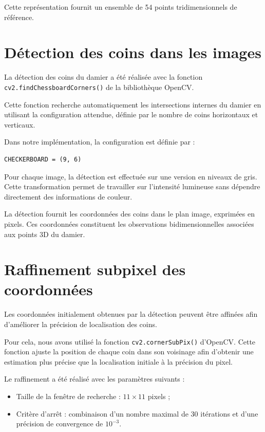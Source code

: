 \documentclass[12pt,a4paper]{report}
\begin{document}
Cette représentation fournit un ensemble de
54 points tridimensionnels de référence.

\section{Détection des coins dans les images}

La détection des coins du damier a été réalisée
avec la fonction
\texttt{cv2.findChessboardCorners()} de la
bibliothèque OpenCV.

Cette fonction recherche automatiquement les
intersections internes du damier en utilisant
la configuration attendue, définie par le nombre
de coins horizontaux et verticaux.

Dans notre implémentation, la configuration est
définie par :

\begin{verbatim}
CHECKERBOARD = (9, 6)
\end{verbatim}

Pour chaque image, la détection est effectuée
sur une version en niveaux de gris. Cette
transformation permet de travailler sur
l'intensité lumineuse sans dépendre directement
des informations de couleur.

La détection fournit les coordonnées des coins
dans le plan image, exprimées en pixels.
Ces coordonnées constituent les observations
bidimensionnelles associées aux points 3D
du damier.

\section{Raffinement subpixel des coordonnées}

Les coordonnées initialement obtenues par la
détection peuvent être affinées afin d'améliorer
la précision de localisation des coins.

Pour cela, nous avons utilisé la fonction
\texttt{cv2.cornerSubPix()} d'OpenCV. Cette
fonction ajuste la position de chaque coin
dans son voisinage afin d'obtenir une estimation
plus précise que la localisation initiale
à la précision du pixel.

Le raffinement a été réalisé avec les paramètres
suivants :

\begin{itemize}
    \item Taille de la fenêtre de recherche :
    $11 \times 11$ pixels ;
    \item Critère d'arrêt : combinaison d'un
    nombre maximal de 30 itérations et d'une
    précision de convergence de $10^{-3}$.
\end{itemize}
\end{document}
